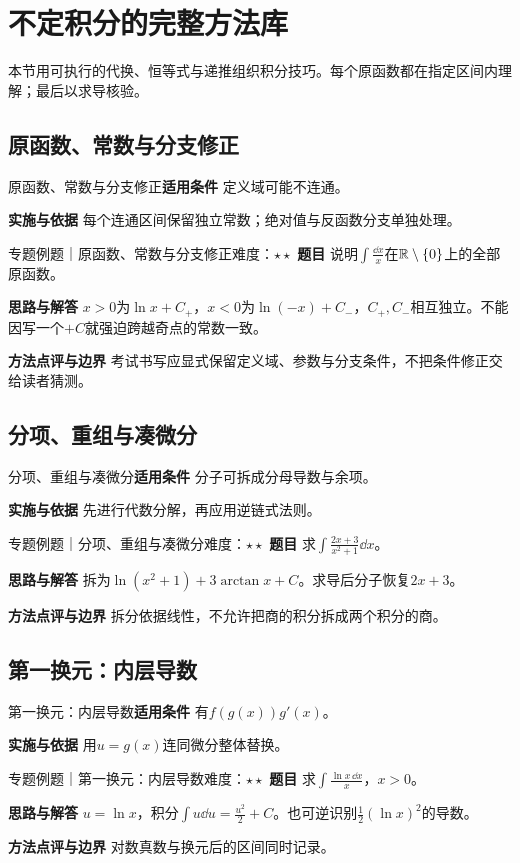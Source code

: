 \section{不定积分的完整方法库}\label{mat:integrals_methods}
\begin{examtip}本节用可执行的代换、恒等式与递推组织积分技巧。每个原函数都在指定区间内理解；最后以求导核验。\end{examtip}
\subsection{原函数、常数与分支修正}\label{mat:integrals_methods:i01}
\begin{method}{原函数、常数与分支修正}\textbf{适用条件} 定义域可能不连通。\par\textbf{实施与依据} 每个连通区间保留独立常数；绝对值与反函数分支单独处理。\end{method}
\begin{example}{专题例题｜原函数、常数与分支修正}{难度：$\star\star$}
\textbf{题目} 说明$\int\frac{\dd x}{x}$在$\mathbb{R}\setminus\{0\}$上的全部原函数。\par\textbf{思路与解答} $x>0$为$\ln x+C_+$，$x<0$为$\ln(-x)+C_-$，$C_+,C_-$相互独立。不能因写一个$+C$就强迫跨越奇点的常数一致。\par\textbf{方法点评与边界} 考试书写应显式保留定义域、参数与分支条件，不把条件修正交给读者猜测。
\end{example}
\subsection{分项、重组与凑微分}\label{mat:integrals_methods:i02}
\begin{method}{分项、重组与凑微分}\textbf{适用条件} 分子可拆成分母导数与余项。\par\textbf{实施与依据} 先进行代数分解，再应用逆链式法则。\end{method}
\begin{example}{专题例题｜分项、重组与凑微分}{难度：$\star\star$}
\textbf{题目} 求$\int\frac{2x+3}{x^2+1}\dd x$。\par\textbf{思路与解答} 拆为$\ln(x^2+1)+3\arctan x+C$。求导后分子恢复$2x+3$。\par\textbf{方法点评与边界} 拆分依据线性，不允许把商的积分拆成两个积分的商。
\end{example}
\subsection{第一换元：内层导数}\label{mat:integrals_methods:i03}
\begin{method}{第一换元：内层导数}\textbf{适用条件} 有$f(g(x))g\prime(x)$。\par\textbf{实施与依据} 用$u=g(x)$连同微分整体替换。\end{method}
\begin{example}{专题例题｜第一换元：内层导数}{难度：$\star\star$}
\textbf{题目} 求$\int\frac{\ln x\,\dd x}{x}$，$x>0$。\par\textbf{思路与解答} $u=\ln x$，积分$\int u\dd u=\frac{u^2}{2}+C$。也可逆识别$\frac12(\ln x)^2$的导数。\par\textbf{方法点评与边界} 对数真数与换元后的区间同时记录。
\end{example}
